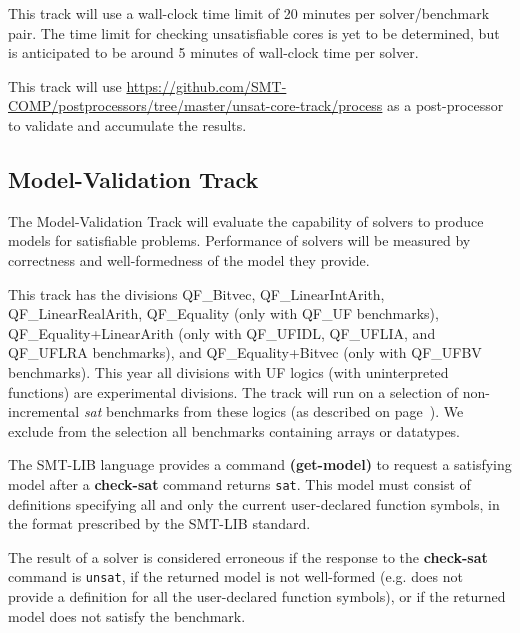\documentclass[12pt]{article}
\newcommand{\akey}[1]{\textbf{#1}\xspace}
\newcommand{\mvaltrack}{Model-Validation Track\xspace}
\begin{document}
This track will use a wall-clock time limit of 20 minutes per solver/benchmark
pair. The time limit for checking unsatisfiable cores is yet to be determined,
but is anticipated to be around 5 minutes of wall-clock time per solver.

This track will use
{\url{https://github.com/SMT-COMP/postprocessors/tree/master/unsat-core-track/process}}
as a post-processor
to validate and accumulate the results.

\subsection{\mvaltrack}
\label{sec:exec:model}
The \mvaltrack will evaluate the capability of solvers to produce models for
satisfiable problems.  Performance of solvers will be measured by correctness
and well-formedness of the model they provide.

  This track has the divisions QF\_Bitvec,
QF\_LinearIntArith, QF\_LinearReal\-Arith, QF\_Equality (only with QF\_UF
benchmarks), QF\_Equality+LinearArith (only with QF\_UFIDL, QF\_UFLIA, and
QF\_UFLRA benchmarks), and QF\_Equality+Bitvec (only with QF\_UFBV benchmarks).
%
This year all divisions with UF logics (with uninterpreted functions) are
experimental divisions.
%
The track will run on a
selection of non-incremental \emph{sat} benchmarks from these
logics (as described on page~\pageref{benchmark-selection}).
%
We exclude from the selection all benchmarks containing arrays or datatypes.

The SMT-LIB language provides a command \akey{(get-model)} to request a
satisfying model after a \akey{check-sat} command returns \texttt{sat}.  This
model must consist of definitions specifying all and only the current
user-declared function symbols, in the format prescribed by the SMT-LIB
standard.

The result of a solver is considered erroneous if the response to the
\akey{check-sat} command is \texttt{unsat}, if the returned model is not
well-formed (e.g. does not provide a definition for all the user-declared
function symbols), or if the returned model does not satisfy the benchmark.
\end{document}

